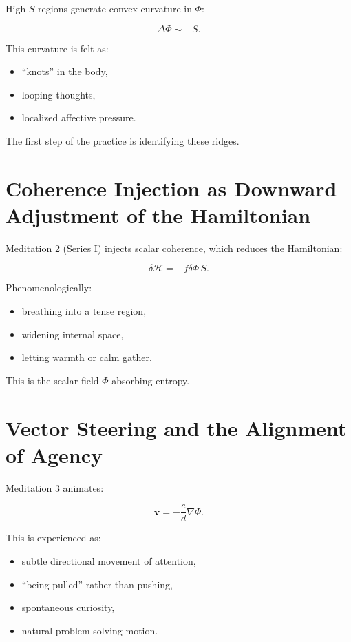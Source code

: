 \documentclass[12pt]{article}
\begin{document}
High-$S$ regions generate convex curvature in $\Phi$:

\[
\Delta\Phi \sim -S.
\]

This curvature is felt as:

\begin{itemize}
    \item ``knots'' in the body,
    \item looping thoughts,
    \item localized affective pressure.
\end{itemize}

The first step of the practice is identifying these ridges.

\section{Coherence Injection as Downward Adjustment of the Hamiltonian}

Meditation 2 (Series I) injects scalar coherence, which reduces the Hamiltonian:

\[
\delta \mathcal{H} = - f \delta\Phi \, S.
\]

Phenomenologically:

\begin{itemize}
    \item breathing into a tense region,
    \item widening internal space,
    \item letting warmth or calm gather.
\end{itemize}

This is the scalar field $\Phi$ absorbing entropy.

\section{Vector Steering and the Alignment of Agency}

Meditation 3 animates:

\[
\mathbf{v} = -\frac{e}{d} \nabla\Phi.
\]

This is experienced as:

\begin{itemize}
    \item subtle directional movement of attention,
    \item ``being pulled'' rather than pushing,
    \item spontaneous curiosity,
    \item natural problem-solving motion.
\end{itemize}
\end{document}
